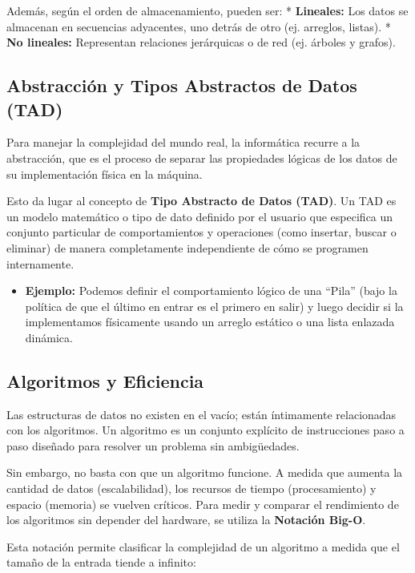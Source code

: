 \documentclass[
  spanish,
  letterpaper,
  DIV=11,
  numbers=noendperiod]{scrreprt}
\providecommand{\tightlist}{%
  \setlength{\itemsep}{0pt}\setlength{\parskip}{0pt}}
\begin{document}
Además, según el orden de almacenamiento, pueden ser: *
\textbf{Lineales:} Los datos se almacenan en secuencias adyacentes, uno
detrás de otro (ej. arreglos, listas). * \textbf{No lineales:}
Representan relaciones jerárquicas o de red (ej. árboles y grafos).

\subsection{Abstracción y Tipos Abstractos de Datos
(TAD)}\label{abstracciuxf3n-y-tipos-abstractos-de-datos-tad}

Para manejar la complejidad del mundo real, la informática recurre a la
abstracción, que es el proceso de separar las propiedades lógicas de los
datos de su implementación física en la máquina.

Esto da lugar al concepto de \textbf{Tipo Abstracto de Datos (TAD)}. Un
TAD es un modelo matemático o tipo de dato definido por el usuario que
especifica un conjunto particular de comportamientos y operaciones (como
insertar, buscar o eliminar) de manera completamente independiente de
cómo se programen internamente.

\begin{itemize}
\tightlist
\item
  \textbf{Ejemplo:} Podemos definir el comportamiento lógico de una
  ``Pila'' (bajo la política de que el último en entrar es el primero en
  salir) y luego decidir si la implementamos físicamente usando un
  arreglo estático o una lista enlazada dinámica.
\end{itemize}

\subsection{Algoritmos y Eficiencia}\label{algoritmos-y-eficiencia}

Las estructuras de datos no existen en el vacío; están íntimamente
relacionadas con los algoritmos. Un algoritmo es un conjunto explícito
de instrucciones paso a paso diseñado para resolver un problema sin
ambigüedades.

Sin embargo, no basta con que un algoritmo funcione. A medida que
aumenta la cantidad de datos (escalabilidad), los recursos de tiempo
(procesamiento) y espacio (memoria) se vuelven críticos. Para medir y
comparar el rendimiento de los algoritmos sin depender del hardware, se
utiliza la \textbf{Notación Big-O}.

Esta notación permite clasificar la complejidad de un algoritmo a medida
que el tamaño de la entrada tiende a infinito:
\end{document}
